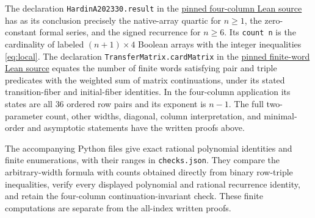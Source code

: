 \documentclass[11pt]{article}
\begin{document}
The declaration \texttt{HardinA202330.result} in the
\href{https://github.com/the-omega-institute/trureturing/blob/79dfe4f731baccd42dd3c56cf6331a0ddd3cafdb/D5/S3/Combinatorics/TraceAvoidingArrays/HardinA202330.lean}{pinned four-column Lean source}
has as its conclusion precisely the native-array quartic for $n\ge1$, the zero-constant formal series, and the signed recurrence for $n\ge6$. Its \texttt{count n} is the cardinality of labeled $(n+1)\times4$ Boolean arrays with the integer inequalities \eqref{eq:local}.
The declaration \texttt{TransferMatrix.cardMatrix} in the
\href{https://github.com/the-omega-institute/trureturing/blob/79dfe4f731baccd42dd3c56cf6331a0ddd3cafdb/D5/S3/Combinatorics/TraceAvoidingArrays/TransferMatrix.lean}{pinned finite-word Lean source}
equates the number of finite words satisfying pair and triple predicates with the weighted sum of matrix continuations, under its stated transition-fiber and initial-fiber identities. In the four-column application its states are all $36$ ordered row pairs and its exponent is $n-1$. The full two-parameter count, other widths, diagonal, column interpretation, and minimal-order and asymptotic statements have the written proofs above.

The accompanying Python files give exact rational polynomial identities and finite enumerations, with their ranges in \texttt{checks.json}. They compare the arbitrary-width formula with counts obtained directly from binary row-triple inequalities, verify every displayed polynomial and rational recurrence identity, and retain the four-column continuation-invariant check. These finite computations are separate from the all-index written proofs.
\end{document}
